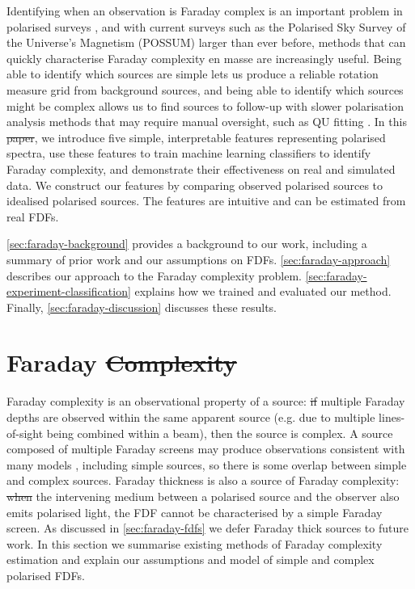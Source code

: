 \documentclass[11pt, a4paper]{book}
\providecommand{\DIFaddtex}[1]{{\protect\color{blue}\uwave{#1}}} %
\providecommand{\DIFdeltex}[1]{{\protect\color{red}\sout{#1}}}                      %
\providecommand{\DIFaddbegin}{} %
\providecommand{\DIFaddend}{} %
\providecommand{\DIFdelbegin}{} %
\providecommand{\DIFdelend}{} %
\providecommand{\DIFadd}[1]{\texorpdfstring{\DIFaddtex{#1}}{#1}} %
\providecommand{\DIFdel}[1]{\texorpdfstring{\DIFdeltex{#1}}{}} %
\newcommand{\DIFscaledelfig}{0.5}
\newlength{\DIFdelgraphicswidth} %
\newlength{\DIFdelgraphicsheight} %
\newcommand{\DIFaddincludegraphics}[2][]{{\color{blue}\fbox{\DIFOincludegraphics[#1]{#2}}}} %
\newcommand{\DIFdelincludegraphics}[2][]{%
\sbox{\DIFdelgraphicsbox}{\DIFOincludegraphics[#1]{#2}}%
\settoboxwidth{\DIFdelgraphicswidth}{\DIFdelgraphicsbox} %
\settoboxtotalheight{\DIFdelgraphicsheight}{\DIFdelgraphicsbox} %
\scalebox{\DIFscaledelfig}{%
\parbox[b]{\DIFdelgraphicswidth}{\usebox{\DIFdelgraphicsbox}\\[-\baselineskip] \rule{\DIFdelgraphicswidth}{0em}}\llap{\resizebox{\DIFdelgraphicswidth}{\DIFdelgraphicsheight}{%
\setlength{\unitlength}{\DIFdelgraphicswidth}%
\begin{picture}(1,1)%
\thicklines\linethickness{2pt} %
{\color[rgb]{1,0,0}\put(0,0){\framebox(1,1){}}}%
{\color[rgb]{1,0,0}\put(0,0){\line( 1,1){1}}}%
{\color[rgb]{1,0,0}\put(0,1){\line(1,-1){1}}}%
\end{picture}%
}\hspace*{3pt}}} %
} %
\DeclareRobustCommand{\DIFaddbegin}{\DIFOaddbegin \let\includegraphics\DIFaddincludegraphics} %
\DeclareRobustCommand{\DIFaddend}{\DIFOaddend \let\includegraphics\DIFOincludegraphics} %
\DeclareRobustCommand{\DIFdelbegin}{\DIFOdelbegin \let\includegraphics\DIFdelincludegraphics} %
\DeclareRobustCommand{\DIFdelend}{\DIFOaddend \let\includegraphics\DIFOincludegraphics} %
\begin{document}
  Identifying when an observation is Faraday complex is an important problem in polarised surveys \citep{sun15comparison}, and with current surveys such as the Polarised Sky Survey of the Universe's Magnetism (POSSUM) larger than ever before, methods that can quickly characterise Faraday complexity en masse are increasingly useful. Being able to identify which sources are simple lets us produce a reliable rotation measure grid from background sources, and being able to identify which sources might be complex allows us to find sources to follow-up with slower polarisation analysis methods that may require manual oversight, such as QU fitting \citep[as seen in e.g.][]{miyashita19qu,osullivan_broad-band_2017}. In this \DIFdelbegin \DIFdel{paper}\DIFdelend \DIFaddbegin \DIFadd{chapter}\DIFaddend , we introduce five simple, interpretable features representing polarised spectra, use these features to train machine learning classifiers to identify Faraday complexity, and demonstrate their effectiveness on real and simulated data. We construct our features by comparing observed polarised sources to idealised polarised sources. The features are intuitive and can be estimated from real FDFs.

  \autoref{sec:faraday-background} provides a background to our work, including a summary of prior work and our assumptions on FDFs. \autoref{sec:faraday-approach} describes our approach to the Faraday complexity problem. \autoref{sec:faraday-experiment-classification} explains how we trained and evaluated our method. Finally, \autoref{sec:faraday-discussion} discusses these results.

\section{Faraday \DIFdelbegin \DIFdel{Complexity}\DIFdelend \DIFaddbegin \DIFadd{complexity}\DIFaddend }
\label{sec:faraday-background}

    Faraday complexity is an observational property of a source: \DIFdelbegin \DIFdel{if }\DIFdelend \DIFaddbegin \DIFadd{If }\DIFaddend multiple Faraday depths are observed within the same apparent source (e.g. due to multiple lines-of-sight being combined within a beam), then the source is complex. A source composed of multiple Faraday screens may produce observations consistent with many models \citep{sun15comparison}, including simple sources, so there is some overlap between simple and complex sources. Faraday thickness is also a source of Faraday complexity: \DIFdelbegin \DIFdel{when }\DIFdelend \DIFaddbegin \DIFadd{When }\DIFaddend the intervening medium between a polarised source and the observer also emits polarised light, the FDF cannot be characterised by a simple Faraday screen. As discussed in \autoref{sec:faraday-fdfs} we defer Faraday thick sources to future work. In this section we summarise existing methods of Faraday complexity estimation and explain our assumptions and model of simple and complex polarised FDFs.
\end{document}
